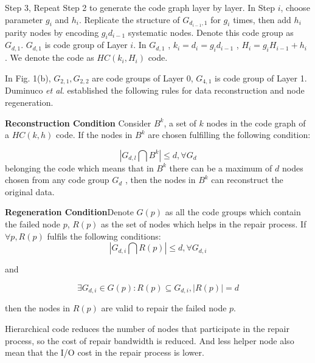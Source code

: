 \documentclass{article} %
\begin{document}
	Step 3, Repeat Step 2 to generate the code graph layer by layer. In Step $i$, choose parameter $g_i$ and $h_i$. Replicate the structure of $G_{d_{i-1}, 1}$  for $g_i$  times, then add $h_i$  parity nodes by encoding $g_id_{i-1}$  systematic nodes. Denote this code group as $G_{d, 1}$. $G_{d, 1}$ is code group of Layer $i$. In $G_{d, 1}$ , $k_i = d_i = g_id_{i- 1}$  , $H_i = g_iH_{i - 1} + h_i$ . We denote the code as $HC(k_i, H_i)$ code.

In Fig. 1(b), $G_{2, 1}, G_{2, 2}$  are code groups of Layer 0, $G_{4, 1}$ is code group of Layer 1. Duminuco \emph{et al}. established the following rules for data reconstruction and node regeneration.

\textbf{Reconstruction Condition} Consider $B^k$, a set of $k$ nodes in the code graph of a $HC(k, h)$ code. If the nodes in $B^k$ are chosen fulfilling the following condition:

$$|G_{d, l} \bigcap B^k| \le d, \forall G_d$$
belonging the code which means that in $B^k$  there can be a maximum of $d$ nodes chosen from any code group $G_d$ , then the nodes in $B^k$ can reconstruct the original data.

\textbf{Regeneration Condition}Denote $G(p)$ as all the code groups which contain the failed node $p$, $R(p)$ as the set of nodes which helps in the repair process. If $\forall p, R(p)$ fulfils the following conditions:
$$|G_{d, i} \bigcap R(p)| \le d, \forall G_{d, i}$$

and 

$$\exists G_{d, i} \in G(p) : R(p) \subseteq G_{d, i}, |R(p)| = d$$

then the nodes in $R(p)$ are valid to repair the failed node $p$.

Hierarchical code reduces the number of nodes that participate in the repair process, so the cost of repair bandwidth is reduced. And less helper node also mean that the I/O cost in the repair process is lower.
\end{document}
